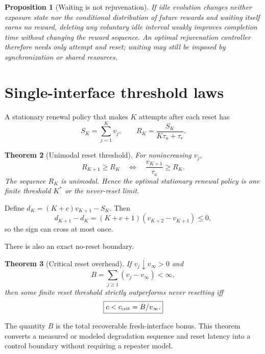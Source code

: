 \documentclass[aps,prx,reprint,superscriptaddress,nofootinbib,longbibliography,floatfix]{revtex4-2}
\newtheorem{theorem}{Theorem}\newtheorem{proposition}[theorem]{Proposition}\newtheorem{corollary}[theorem]{Corollary}
\begin{document}
\begin{proposition}[Waiting is not rejuvenation]
If idle evolution changes neither exposure state nor the conditional distribution of future rewards and waiting itself earns no reward, deleting any voluntary idle interval weakly improves completion time without changing the reward sequence. An optimal rejuvenation controller therefore needs only \emph{attempt} and \emph{reset}; waiting may still be imposed by synchronization or shared resources.
\end{proposition}

\section{Single-interface threshold laws}
A stationary renewal policy that makes $K$ attempts after each reset has
\begin{equation}
S_K=\sum_{j=1}^{K}v_j,
\qquad
R_K=\frac{S_K}{K\tau_a+\tau_r}.
\end{equation}

\begin{theorem}[Unimodal reset threshold]
For nonincreasing $v_j$,
\begin{equation}
R_{K+1}\ge R_K
\quad\Longleftrightarrow\quad
\frac{v_{K+1}}{\tau_a}\ge R_K.
\end{equation}
The sequence $R_K$ is unimodal. Hence the optimal stationary renewal policy is one finite threshold $K^*$ or the never-reset limit.
\end{theorem}

Define $d_K=(K+c)v_{K+1}-S_K$. Then
\begin{equation}
d_{K+1}-d_K=(K+c+1)(v_{K+2}-v_{K+1})\le0,
\end{equation}
so the sign can cross at most once.

There is also an exact no-reset boundary.

\begin{theorem}[Critical reset overhead]
If $v_j\downarrow v_\infty>0$ and
\begin{equation}
B=\sum_{j\ge1}(v_j-v_\infty)<\infty,
\end{equation}
then some finite reset threshold strictly outperforms never resetting iff
\begin{equation}
\boxed{c<c_{\rm crit}=B/v_\infty.}
\end{equation}
\end{theorem}
The quantity $B$ is the total recoverable fresh-interface bonus. This theorem converts a measured or modeled degradation sequence and reset latency into a control boundary without requiring a repeater model.
\end{document}
